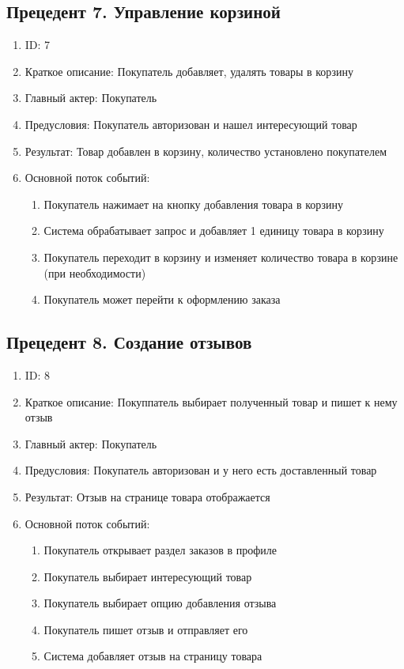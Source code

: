 \documentclass{article}
\begin{document}
\subsection{Прецедент 7. Управление корзиной}
\begin{enumerate}
    \item ID: 7
    \item Краткое описание: Покупатель добавляет, удалять товары в корзину
    \item Главный актер: Покупатель
    \item Предусловия: Покупатель авторизован и нашел интересующий товар
    \item Результат: Товар добавлен в корзину, количество установлено покупателем
    \item Основной поток событий:
    \begin{enumerate}
        \item Покупатель нажимает на кнопку добавления товара в корзину
        \item Система обрабатывает запрос и добавляет 1 единицу товара в корзину
        \item Покупатель переходит в корзину и изменяет количество товара в корзине (при необходимости)
        \item Покупатель может перейти к оформлению заказа
    \end{enumerate}
\end{enumerate}

\subsection{Прецедент 8. Создание отзывов}
\begin{enumerate}
    \item ID: 8
    \item Краткое описание: Покуппатель выбирает полученный товар и пишет к нему отзыв
    \item Главный актер: Покупатель
    \item Предусловия: Покупатель авторизован и у него есть доставленный товар
    \item Результат: Отзыв на странице товара отображается
    \item Основной поток событий:
    \begin{enumerate}
        \item Покупатель открывает раздел заказов в профиле
        \item Покупатель выбирает интересующий товар
        \item Покупатель выбирает опцию добавления отзыва
        \item Покупатель пишет отзыв и отправляет его
        \item Система добавляет отзыв на страницу товара
    \end{enumerate}
\end{enumerate}
\end{document}
